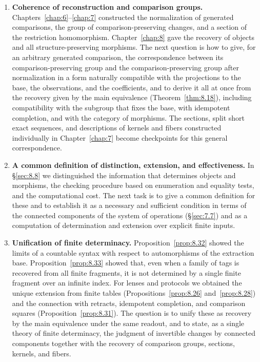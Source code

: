 \begin{enumerate}
\item \textbf{Coherence of reconstruction and comparison groups.}
Chapters~\ref{chap:6}--\ref{chap:7} constructed the normalization of generated comparisons,
the group of comparison-preserving changes, and a section of the restriction homomorphism.
Chapter~\ref{chap:8} gave the recovery of objects and all structure-preserving morphisms.
The next question is how to give, for an arbitrary generated comparison, the
correspondence
between its comparison-preserving group and the comparison-preserving group after
normalization in a form naturally compatible with the projections to the base, the
observations, and the coefficients, and to derive it all at once from the recovery given by
the main equivalence (Theorem~\ref{thm:8.18}), including compatibility with the subgroup
that fixes the base, with idempotent completion, and with the category of morphisms. The
sections, split short exact sequences, and descriptions of kernels and fibers constructed
individually in Chapter~\ref{chap:7} become checkpoints for this general correspondence.
\item \textbf{A common definition of distinction, extension, and effectiveness.} In
\S\ref{sec:8.8} we distinguished the information that determines objects and morphisms, the
checking procedure based on enumeration and equality tests, and the computational cost. The
next task is to give a common definition for these and to establish it as a necessary and
sufficient condition in terms of the connected components of the system of operations
(\S\ref{sec:7.7}) and as a computation of determination and extension over explicit finite
inputs.
\item \textbf{Unification of finite determinacy.} Proposition~\ref{prop:8.32} showed the
limits of a countable syntax with respect to automorphisms of the extraction base.
Proposition~\ref{prop:8.33} showed that, even when a family of tags is recovered from all
finite fragments, it is not determined by a single finite fragment over an infinite index.
For lenses and protocols we obtained the unique extension from finite tables
(Propositions~\ref{prop:8.26} and~\ref{prop:8.28}) and the connection with retracts,
idempotent completion, and comparison squares (Proposition~\ref{prop:8.31}). The question is
to unify these as recovery by the main equivalence under the same readout, and to state, as
a single theory of finite determinacy, the judgment of invertible changes by connected
components together with the recovery of comparison groups, sections, kernels, and fibers.

\end{enumerate}
